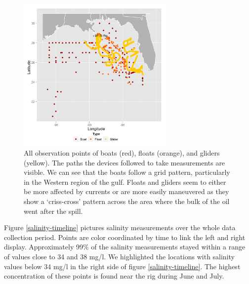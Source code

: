 \documentclass[authoryear,12pt]{elsarticle}
\newcommand{\red}[1]{{\color{red} #1}}
\begin{document}
\begin{figure}[htbp] %
   \centering
   \includegraphics[width=3in]{boats-floats-gliders.png} 
   \caption{All observation points of boats (red), floats (orange), and gliders (yellow). The paths the devices followed to take measurements are visible. We can see that the boats follow a grid pattern, particularly in the Western region of the gulf. Floats and gliders seem to either be more affected by currents or are more easily maneuvered as they show a `criss-cross' pattern across the area where the bulk of the oil went after the spill.}
   \label{Boats, Floats and Gliders}
\end{figure}
Figure \ref{salinity-timeline} pictures salinity measurements over the whole data collection period. Points are color coordinated by time to link the left and right display. Approximately 99\% of the salinity measurements stayed within a range of values close {to} 34 and 38 mg/l.
{We highlighted the locations with salinity values below 34 mg/l} in the right side of figure \ref{salinity-timeline}. The highest concentration of these points is found near the rig during June and July.
\end{document}
